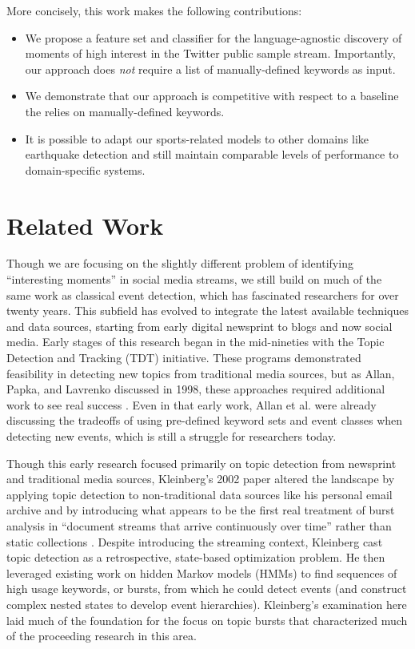 \documentclass{sig-alternate}
\begin{document}
More concisely, this work makes the following contributions:
%
\begin{itemize}
\item We propose a feature set and classifier for the language-agnostic discovery of moments of high interest in the Twitter public sample stream. Importantly, our approach does {\it not} require a list of manually-defined keywords as input.

\item We demonstrate that our approach is competitive with respect to a baseline the relies on manually-defined keywords.

\item It is possible to adapt our sports-related models to other domains like earthquake detection and still maintain comparable levels of performance to domain-specific systems.
\end{itemize}

\section{Related Work}
\label{sect:relatedWork}

Though we are focusing on the slightly different problem of identifying ``interesting moments'' in social media streams, we still build on much of the same work as classical event detection, which has fascinated researchers for over twenty years.
This subfield has evolved to integrate the latest available techniques and data sources, starting from early digital newsprint to blogs and now social media.
Early stages of this research began in the mid-nineties with the Topic Detection and Tracking (TDT) initiative.
These programs demonstrated feasibility in detecting new topics from traditional media sources, but as Allan, Papka, and Lavrenko discussed in 1998, these approaches required additional work to see real success \cite{allan1998line}.
Even in that early work, Allan et al. were already discussing the tradeoffs of using pre-defined keyword sets and event classes when detecting new events, which is still a struggle for researchers today.

Though this early research focused primarily on topic detection from newsprint and traditional media sources, Kleinberg's 2002 paper altered the landscape by applying topic detection to non-traditional data sources like his personal email archive and by introducing what appears to be the first real treatment of burst analysis in ``document streams that arrive continuously over time'' rather than  static collections \cite{Kleinberg:2002:BHS:775047.775061}. 
Despite introducing the streaming context, Kleinberg cast topic detection as a retrospective, state-based optimization problem.
He then leveraged existing work on hidden Markov models (HMMs) to find sequences of high usage keywords, or bursts, from which he could detect events (and construct complex nested states to develop event hierarchies).
Kleinberg's examination here laid much of the foundation for the focus on topic bursts that characterized much of the proceeding research in this area.
\end{document}
